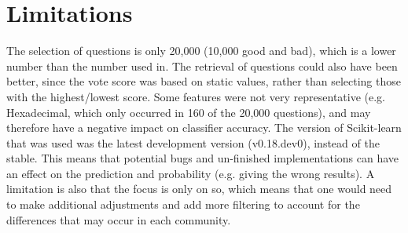 \begin{comment}
The quality of a question is based on the votes given by the users of the StackOverflow community. 
Therefore the vote score was used to label the question as either good (score > 0) or bad (score < 0). 
This is justified by the fact that you can draw a comparison between the peer-review process used in academia and the peer-review process used in StackOverflow. 
The process starts with someone posting a question, which is then read, scored and given feedback (through comments or answers). 
The feedback can then improve the question through edits by the poster, based on the feedback given 
(e.g. adding additional information or explaining how the given problem(s) occurred).
\vspace{0.5em}\newline
Scikit-learns \gls{svm} implementation is based on libsvm \cite{Chang2011}, but it is simpler to use. 
In addition, scikit-learn focuses on code quality\footnote{Coverage on their GitHub repository was 94\% on 06. May 2015.}, 
to ensure that everything works as it should \cite[p.~3]{Pedregosa2011}.
\vspace{0.5em}\newline
It is not a lot of research being done related to asking and defining good questions. 
Although the focus is only on programming questions, it can still be useful to improve question quality. 
Even if you cannot predict if it is a good question, you can still avoid asking a bad questions. 
This in turn can help to improve the question quality (at least acceptability), and avoid asking questions that will be closed or ignored on StackOverflow.
\end{comment}

\section{Limitations}
\label{sec:limitations}
The selection of questions is only 20,000 (10,000 good and bad), which is a lower number than the number used in.
The retrieval of questions could also have been better, since the vote score was based on static values, rather than selecting those with the highest/lowest score.
Some features were not very representative (e.g. Hexadecimal, which only occurred in 160 of the 20,000 questions), and may therefore have a negative impact on classifier accuracy. 
The version of Scikit-learn that was used was the latest development version (v0.18.dev0), instead of the stable. 
This means that potential bugs and un-finished implementations can have an effect on the prediction and probability (e.g. giving the wrong results).
A limitation is also that the focus is only on \gls{so}, which means that one would need to make additional adjustments and add more filtering to account 
for the differences that may occur in each community.
 
